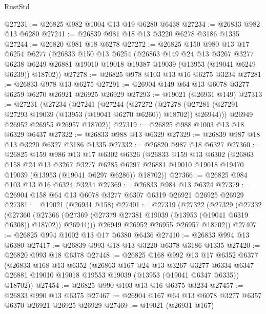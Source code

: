 \begin{lexlean}{RustStd}
\begin{coremodule}
@27231 := @26825 @982 @1004 @13 @19 @6280 @6438
@27234 := @26833 @982 @13 @6280
@27241 := @26839 @981 @18 @13 @3220 @6278 @3186 @1335
@27244 := @26820 @981 @18 @6278
@27272 := @26825
    @150
    @980
    @13
    @17
    @6254
    @6277
    (@26833
      @150
      @13
      @6254
      (@26863
        @149
        @24
        @13
        @3267
        @3277
        @6238
        @6249
        @26881
        @19010
        @19018
        @19387
        @19039
        (@13953 (@19041 @6249 @6239))
        @18702))
@27278 := @26825 @978 @103 @13 @16 @6275 @3234
@27281 := @26833 @978 @13 @6275
@27291 := @26904 @149 @64 @13 @6078 @3277 @6259 @6270 @26921 @26925 @26929
@27293 := @19021 (@26931 @149)
@27313 := @27231
    (@27234
      (@27241
        (@27244
          (@27272
            (@27278 (@27281 (@27291 @27293 @19039 (@13953 (@19041 @6270 @6260)) @18702)) @26944)))
        @26949
        @26952
        @26955
        @26957
        @18702))
@27319 := @26825 @988 @1003 @13 @18 @6329 @6437
@27322 := @26833 @988 @13 @6329
@27329 := @26839 @987 @18 @13 @3220 @6327 @3186 @1335
@27332 := @26820 @987 @18 @6327
@27360 := @26825
    @159
    @986
    @13
    @17
    @6302
    @6326
    (@26833
      @159
      @13
      @6302
      (@26863
        @158
        @24
        @13
        @3267
        @3277
        @6285
        @6297
        @26881
        @19010
        @19018
        @19470
        @19039
        (@13953 (@19041 @6297 @6286))
        @18702))
@27366 := @26825 @984 @103 @13 @16 @6324 @3234
@27369 := @26833 @984 @13 @6324
@27379 := @26904 @158 @64 @13 @6078 @3277 @6307 @6319 @26921 @26925 @26929
@27381 := @19021 (@26931 @158)
@27401 := @27319
    (@27322
      (@27329
        (@27332
          (@27360
            (@27366 (@27369 (@27379 @27381 @19039 (@13953 (@19041 @6319 @6308)) @18702)) @26944)))
        @26949
        @26952
        @26955
        @26957
        @18702))
@27407 := @26825 @994 @1002 @13 @17 @6380 @6436
@27410 := @26833 @994 @13 @6380
@27417 := @26839 @993 @18 @13 @3220 @6378 @3186 @1335
@27420 := @26820 @993 @18 @6378
@27448 := @26825
    @168
    @992
    @13
    @17
    @6352
    @6377
    (@26833
      @168
      @13
      @6352
      (@26863
        @167
        @24
        @13
        @3267
        @3277
        @6334
        @6347
        @26881
        @19010
        @19018
        @19553
        @19039
        (@13953 (@19041 @6347 @6335))
        @18702))
@27454 := @26825 @990 @103 @13 @16 @6375 @3234
@27457 := @26833 @990 @13 @6375
@27467 := @26904 @167 @64 @13 @6078 @3277 @6357 @6370 @26921 @26925 @26929
@27469 := @19021 (@26931 @167)

\end{coremodule}
\end{lexlean}
